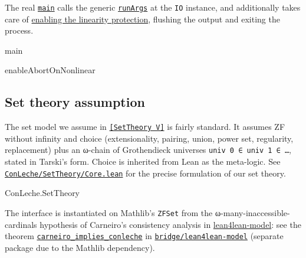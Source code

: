 \documentclass{article}
\newcommand\code[1]{\texttt{#1}}
\begin{document}
The real \href{https://github.com/leanprover/con-leche/blob/master/Main.lean#L84}{\code{main}} calls the generic \href{https://github.com/leanprover/con-leche/blob/master/ConLeche/Driver/Cli.lean#L446}{\code{runArgs}} at the \code{IO} instance, and additionally takes care of \href{https://github.com/leanprover/con-leche/blob/master/Main.lean#L29}{enabling the linearity protection}, flushing the output and exiting the process.

\begin{leanblock}[view=lean, sum=bbUsUwjZXN]{main}{}
\end{leanblock}

\begin{leanblock}[view=lean, sum=sitnpaXY4D]{enableAbortOnNonlinear}{}
\end{leanblock}

\subsection*{Set theory assumption}

The set model we assume in \href{https://github.com/leanprover/con-leche/blob/master/ConLeche/SetTheory/Core.lean#L95-L133}{\code{[SetTheory V]}} is fairly standard. It assumes ZF without infinity and choice (extensionality, pairing, union, power set, regularity, replacement) plus an ω-chain of Grothendieck universes \code{univ 0 ∈ univ 1 ∈ …}, stated in Tarski's form. Choice is inherited from Lean as the meta-logic. See \href{https://github.com/leanprover/con-leche/blob/master/ConLeche/SetTheory/Core.lean}{\code{ConLeche/SetTheory/Core.lean}} for the precise formulation of our set theory.

\begin{leanblock}[view=lean, sum=1ogm3JcOEU]{ConLeche.SetTheory}{}
\end{leanblock}

The interface is instantiated on Mathlib's \code{ZFSet} from the ω-many-inaccessible-cardinals hypothesis of Carneiro's consistency analysis in \href{https://github.com/digama0/lean4lean-model}{lean4lean-model}: see the theorem \href{https://github.com/leanprover/con-leche/blob/master/bridge/lean4lean-model/ConLecheBridge/Carneiro.lean#L200-L202}{\code{carneiro\_implies\_conleche}} in \href{https://github.com/leanprover/con-leche/tree/master/bridge/lean4lean-model}{\code{bridge/lean4lean-model}} (separate package due to the Mathlib dependency).
\end{document}
